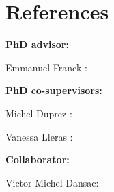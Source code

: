 \documentclass[11pt,a4paper,sans]{moderncv}
\begin{document}
    \section{References}

        \textbf{PhD advisor:}

        Emmanuel Franck : 
        
        \smallskip
        \textbf{PhD co-supervisors:}

        Michel Duprez : 

        Vanessa Lleras : 

        \smallskip
        \textbf{Collaborator:}

        Victor Michel-Dansac: 
\end{document}

